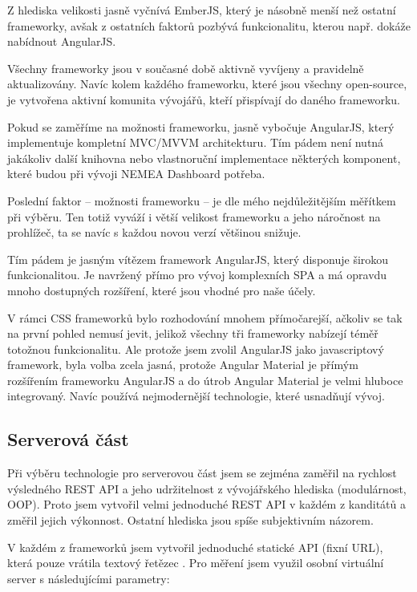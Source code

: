 Z hlediska velikosti jasně vyčnívá EmberJS, který je násobně menší než ostatní frameworky, avšak z ostatních faktorů pozbývá funkcionalitu, kterou např. dokáže nabídnout AngularJS.

Všechny frameworky jsou v současné době aktivně vyvíjeny a pravidelně aktualizovány. Navíc kolem každého frameworku, které jsou všechny open-source, je vytvořena aktivní komunita vývojářů, kteří přispívají do daného frameworku.

Pokud se zaměříme na možnosti frameworku, jasně vybočuje AngularJS, který implementuje kompletní MVC/MVVM architekturu. Tím pádem není nutná jakákoliv další knihovna nebo vlastnoruční implementace některých komponent, které budou při vývoji NEMEA Dashboard potřeba.

Poslední faktor -- možnosti frameworku -- je dle mého nejdůležitějším měřítkem při výběru. Ten totiž vyváží i větší velikost frameworku a jeho náročnost na prohlížeč, ta se navíc s každou novou verzí většinou snižuje.

Tím pádem je jasným vítězem framework AngularJS, který disponuje širokou funkcionalitou. Je navržený přímo pro vývoj komplexních SPA a má opravdu mnoho dostupných rozšíření, které jsou vhodné pro naše účely.

V rámci CSS frameworků bylo rozhodování mnohem přímočarejší, ačkoliv se tak na první pohled nemusí jevit, jelikož všechny tři frameworky nabízejí téměř totožnou funkcionalitu. Ale protože jsem zvolil AngularJS jako javascriptový framework, byla volba zcela jasná, protože Angular Material je přímým rozšířením frameworku AngularJS a do útrob Angular Material je velmi hluboce integrovaný. Navíc používá nejmodernější technologie, které usnadňují vývoj.

\subsection{Serverová část}

Při výběru technologie pro serverovou část jsem se zejména zaměřil na rychlost výsledného REST API a jeho udržitelnost z vývojářského hlediska (modulárnost, OOP). Proto jsem vytvořil velmi jednoduché REST API v každém z kanditátů a změřil jejich výkonnost. Ostatní hlediska jsou spíše subjektivním názorem.

V každém z frameworků jsem vytvořil jednoduché statické API (fixní URL), která pouze vrátila textový řetězec . Pro měření jsem využil osobní virtuální server s následujícími parametry:

